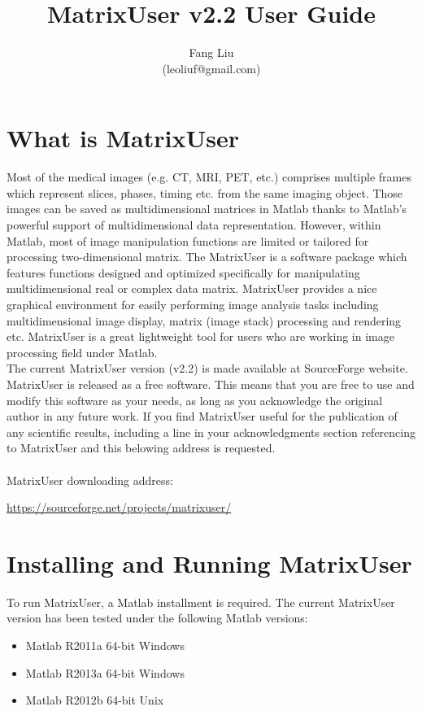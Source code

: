 \documentclass{article}%
\begin{document}
\title{MatrixUser v2.2 User Guide}
\author{Fang Liu \\ (leoliuf@gmail.com)}
\maketitle

\tableofcontents

\section{What is MatrixUser}
Most of the medical images (e.g. CT, MRI, PET, etc.) comprises multiple frames which represent slices, phases, timing etc. from the same imaging object. Those images can be saved as multidimensional matrices in Matlab thanks to Matlab's powerful support of multidimensional data representation. However, within Matlab, most of image manipulation functions are limited or tailored for processing two-dimensional matrix. The MatrixUser is a software package which features functions designed and optimized specifically for manipulating multidimensional real or complex data matrix. MatrixUser provides a nice graphical environment for easily performing image analysis tasks including multidimensional image display, matrix (image stack) processing and rendering etc. MatrixUser is a great lightweight tool for users who are working in image processing field under Matlab.\\

The current MatrixUser version (v2.2) is made available at SourceForge website. MatrixUser is released as a free software. This means that you are free to use and modify this software as your needs, as long as you acknowledge the original author in any future work. If you find MatrixUser useful for the publication of any scientific results, including a line in your acknowledgments section referencing to MatrixUser and this belowing address is requested.\\
\\
MatrixUser downloading address:
\begin{center}
\url{https://sourceforge.net/projects/matrixuser/}
\end{center}

\section{Installing and Running MatrixUser}

To run MatrixUser, a Matlab installment is required. The current MatrixUser version has been tested under the following Matlab versions:
\begin{itemize}
\item Matlab R2011a 64-bit Windows
\item Matlab R2013a 64-bit Windows
\item Matlab R2012b 64-bit Unix
\end{itemize}
\end{document}
